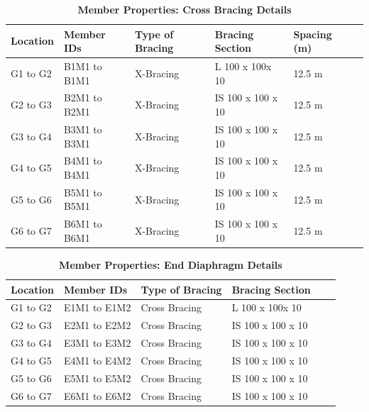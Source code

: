 \documentclass[12pt,a4paper]{report}
\numberwithin{table}{chapter}
\numberwithin{figure}{chapter}
\begin{document}
\begin{longtable}{|L{2.2cm}|L{2.2cm}|L{3.0cm}|L{2.5cm}|C{1.8cm}|C{1.8cm}|}
\caption{\textbf{Member Properties: Cross Bracing Details}}
\hline
\textbf{Location} & \textbf{Member IDs} & \textbf{Type of Bracing} & \textbf{Bracing Section} & \textbf{Spacing (m)} \\
\hline
G1 to G2 & B1M1 to B1M1 & X-Bracing & L 100 x 100x 10 & 12.5 m \\[6pt]
\hline
G2 to G3 & B2M1 to B2M1 & X-Bracing & IS 100 x 100 x 10 & 12.5 m \\[6pt]
\hline
G3 to G4 & B3M1 to B3M1 & X-Bracing & IS 100 x 100 x 10 & 12.5 m \\[6pt]
\hline
G4 to G5 & B4M1 to B4M1 & X-Bracing & IS 100 x 100 x 10 & 12.5 m \\[6pt]
\hline
G5 to G6 & B5M1 to B5M1 & X-Bracing & IS 100 x 100 x 10 & 12.5 m \\[6pt]
\hline
G6 to G7 & B6M1 to B6M1 & X-Bracing & IS 100 x 100 x 10 & 12.5 m \\[6pt]
\hline
\end{longtable}

\vspace{0.4em}
\noindent
\setlength{\tabcolsep}{4pt}
\setlength\LTleft{0pt}
\setlength\LTright{\fill}

\begin{longtable}{|L{2.2cm}|L{2.2cm}|L{3.0cm}|L{2.5cm}|C{1.8cm}|C{1.8cm}|}
\caption{\textbf{Member Properties: End Diaphragm Details}}
\hline
\textbf{Location} & \textbf{Member IDs} & \textbf{Type of Bracing} & \textbf{Bracing Section} \\
\hline
G1 to G2 & E1M1 to E1M2 & Cross Bracing & L 100 x 100x 10 \\[6pt]
\hline
G2 to G3 & E2M1 to E2M2 & Cross Bracing & IS 100 x 100 x 10 \\[6pt]
\hline
G3 to G4 & E3M1 to E3M2 & Cross Bracing & IS 100 x 100 x 10 \\[6pt]
\hline
G4 to G5 & E4M1 to E4M2 & Cross Bracing & IS 100 x 100 x 10 \\[6pt]
\hline
G5 to G6 & E5M1 to E5M2 & Cross Bracing & IS 100 x 100 x 10 \\[6pt]
\hline
G6 to G7 & E6M1 to E6M2 & Cross Bracing & IS 100 x 100 x 10 \\[6pt]
\hline
\end{longtable}



\label{subsec:shear-connectors}

\vspace{2.2em}
\end{document}
